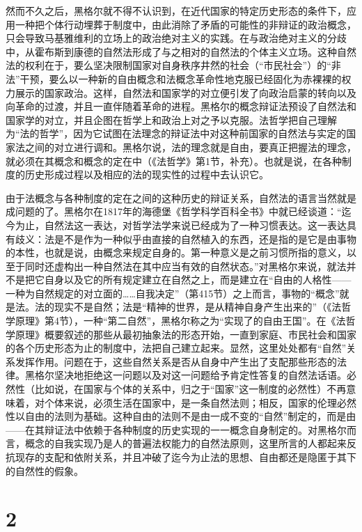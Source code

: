 然而不久之后，黑格尔就不得不认识到，在近代国家的特定历史形态的条件下，应用一种把个体行动埋葬于制度中，由此消除了矛盾的可能性的非辩证的政治概念，只会导致马基雅维利的立场上的政治绝对主义的实践。在与政治绝对主义的分歧中，从霍布斯到康德的自然法形成了与之相对的自然法的个体主义立场。这种自然法的权利在于，要么坚决限制国家对自身秩序井然的社会（“市民社会”）的“非法”干预，要么以一种新的自由概念和法概念革命性地克服已经固化为赤裸裸的权力展示的国家政治。这样，自然法和国家学的对立便引发了向政治启蒙的转向以及向革命的过渡，并且一直伴随着革命的进程。黑格尔的概念辩证法预设了自然法和国家学的对立，并且企图在哲学上和政治上对之予以克服。法哲学把自己理解为“法的哲学”，因为它试图在法理念的辩证法中对这种前国家的自然法与实定的国家法之间的对立进行调和。黑格尔说，法的理念就是自由，要真正把握法的理念，就必须在其概念和概念的定在中（《法哲学》第1节，补充）。也就是说，在各种制度的历史形成过程以及相应的法的现实性的过程中去认识它。

由于法概念与各种制度的定在之间的这种历史的辩证关系，自然法的语言当然就是成问题的了。黑格尔在1817年的海德堡《哲学科学百科全书》中就已经谈道：“迄今为止，自然法这一表达，对哲学法学来说已经成为了一种习惯表达。这一表达具有歧义：法是不是作为一种似乎由直接的自然植入的东西，还是指的是它是由事物的本性，也就是说，由概念来规定自身的。第一种意义是之前习惯所指的意义，以至于同时还虚构出一种自然法在其中应当有效的自然状态。”对黑格尔来说，就法并不是把它自身以及它的所有规定建立在自然之上，而是建立在“自由的人格性——一种为自然规定的对立面的……自我决定”（第415节）之上而言，事物的“概念”就是法。法的现实不是自然；法是“精神的世界，是从精神自身产生出来的”（《法哲学原理》第4节），一种“第二自然”，黑格尔称之为“实现了的自由王国”。在《法哲学原理》概要叙述的那些从最初抽象法的形态开始，一直到家庭、市民社会和国家的各个历史形态为止的制度中，法把自己建立起来。显然，这里处处都有“自然”关系发挥作用。问题在于，这些自然关系是否从自身中产生出了支配那些形态的法律。黑格尔坚决地拒绝这一问题以及对这一问题给予肯定性答复的自然法话语。必然性（比如说，在国家与个体的关系中，归之于“国家”这一制度的必然性）不再意味着，对个体来说，必须生活在国家中，是一条自然法则；相反，国家的伦理必然性以自由的法则为基础。这种自由的法则不是由一成不变的“自然”制定的，而是由——在其辩证法中依赖于各种制度的历史实现的一一概念自身制定的。对黑格尔而言，概念的自我实现乃是人的普遍法权能力的自然法原则，这里所言的人都起来反抗现存的支配和依附关系，并且冲破了迄今为止法的思想、自由都还是隐匿于其下的自然性的假象。

\section*{2}


